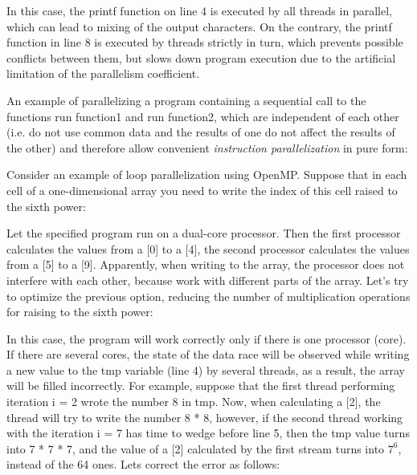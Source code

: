 {	\par In this case, the printf function on line 4 is executed by all threads in parallel, which can lead to mixing of the output characters. On the contrary, the printf function in line 8 is executed by threads strictly in turn, which prevents possible conflicts between them, but slows down program execution due to the artificial limitation of the parallelism coefficient.
	\par An example of parallelizing a program containing a sequential call to the functions run \textunderscore function1 and run \textunderscore function2, which are independent of each other (i.e. do not use common data and the results of one do not affect the results of the other) and therefore allow convenient \textit{instruction parallelization} in pure form:
	\begin{figure}[H]
		
	\end{figure}
	\par Consider an example of loop parallelization using OpenMP. Suppose that in each cell of a one-dimensional array you need to write the index of this cell raised to the sixth power:
	\begin{figure}[H]
		
	\end{figure}
	\par Let the specified program run on a dual-core processor. Then the first processor calculates the values from a [0] to a [4], the second processor calculates the values from a [5] to a [9]. Apparently, when writing to the array, the processor does not interfere with each other, because work with different parts of the array. Let's try to optimize the previous option, reducing the number of multiplication operations for raising to the sixth power:
	\begin{figure}[H]
		
	\end{figure}
	\par In this case, the program will work correctly only if there is one processor (core). If there are several cores, the state of the data race will be observed while writing a new value to the tmp variable (line 4) by several threads, as a result, the array will be filled incorrectly. For example, suppose that the first thread performing iteration i = 2 wrote the number 8 in tmp. Now, when calculating a [2], the thread will try to write the number 8 * 8, however, if the second thread working with the iteration i = 7 has time to wedge before line 5, then the tmp value turns into 7 * 7 * 7, and the value of a [2] calculated by the first stream turns into $ 7 ^ 6 $, instead of the 64 ones. Lets correct the error as follows:
}
